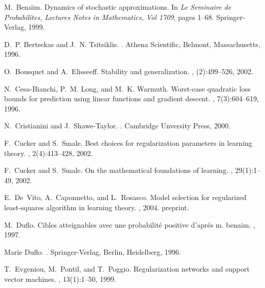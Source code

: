 \documentclass[twoside]{amsart}
\theoremstyle{theorem}
\theoremstyle{definition}
\theoremstyle{remark}
\begin{document}
\begin{thebibliography}{10}

M.~Bena\"{\i}m.
\newblock Dynamics of stochastic approximations.
\newblock In {\em Le Seminaire de Probabilites, Lectures Notes in Mathematics,
  Vol 1709}, pages 1--68. Springer-Verlag, 1999.

D.~P. Bertsekas and J.~N. Tsitsiklis.
.
\newblock Athena Scientific, Belmont, Massachusetts, 1996.

O.~Bousquet and A.~Elisseeff.
\newblock Stability and generalization.
, (2):499--526, 2002.

N.~Cesa-Bianchi, P.~M. Long, and M.~K. Warmuth.
\newblock Worst-case quadratic loss bounds for prediction using linear
  functions and gradient descent.
, 7(3):604--619, 1996.

N.~Cristianini and J.~Shawe-Taylor.
.
\newblock Cambridge Unversity Press, 2000.

F.~Cucker and S.~Smale.
\newblock Best choices for regularization parameters in learning theory.
, 2(4):413--428, 2002.

F.~Cucker and S.~Smale.
\newblock On the mathematical foundations of learning.
, 29(1):1--49, 2002.

E.~De~Vito, A.~Caponnetto, and L.~Rosasco.
\newblock Model selection for regularized least-squares algorithm in learning
  theory.
, 2004.
\newblock preprint.

M.~Duflo.
\newblock Cibles atteignables avec une probabilit\'{e} positive d'apr\'{e}s m.
  benaim.
, 1997.

Marie Duflo.
.
\newblock Springer-Verlag, Berlin, Heidelberg, 1996.

T.~Evgeniou, M.~Pontil, and T.~Poggio.
\newblock Regularization networks and support vector machines.
, 13(1):1--50, 1999.


\end{thebibliography}
\end{document}
